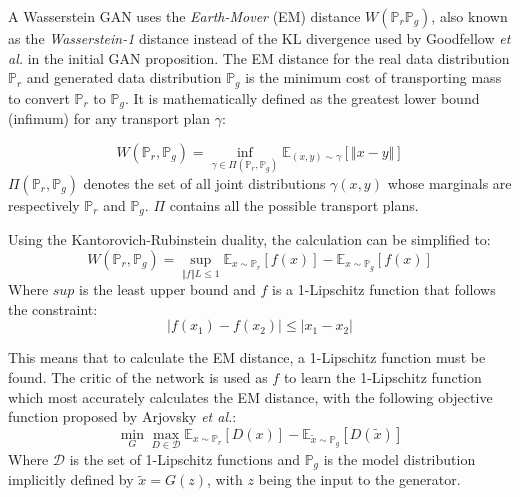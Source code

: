 \documentclass[twocolumn]{article}
\begin{document}
A Wasserstein GAN uses the \emph{Earth-Mover} (EM) distance \(W(\mathbb{P}_r \mathbb{P}_g)\), also known as the \emph{Wasserstein-1} distance instead of the KL divergence used by Goodfellow \emph{et al.}\autocite{goodfellowGenerativeAdversarialNetworks2020} in the initial GAN proposition.
The EM distance for the real data distribution \(\mathbb{P}_r\) and generated data distribution \(\mathbb{P}_g\)  is the minimum cost of transporting mass to convert \(\mathbb{P}_r\) to \(\mathbb{P}_g\).
It is mathematically defined as the greatest lower bound (infimum) for any transport plan \(\gamma\):

\begin{equation}
W(\mathbb{P}_r,\mathbb{P}_g) = \inf_{\gamma \in \Pi(\mathbb{P}_r,\mathbb{P}_g)} \mathbb{E}_{(x,y) \sim \gamma}\left[\Vert x - y \Vert \right]
\end{equation}
\(\Pi(\mathbb{P}_r, \mathbb{P}_g)\) denotes the set of all joint distributions \(\gamma(x,y)\) whose marginals are respectively \(\mathbb{P}_r\) and \(\mathbb{P}_g\).
\(\Pi\) contains all the possible transport plans.

Using the Kantorovich-Rubinstein duality, the calculation can be simplified to:
\begin{equation}
W(\mathbb{P}_r, \mathbb{P}_{g}) = \sup_{\Vert f \Vert L \leq 1} \mathbb{E}_{x \sim \mathbb{P}_r} \left[f(x)\right] - \mathbb{E}_{x \sim \mathbb{P}_{g}} \left[f(x)\right]
\end{equation}
Where \(sup\) is the least upper bound and \(f\) is a 1-Lipschitz function that follows the constraint:
\begin{equation}
\vert f(x_1) - f(x_2) \vert \leq \vert x_1 - x_2 \vert
\end{equation}

This means that to calculate the EM distance, a 1-Lipschitz function must be found.
The critic of the network is used as \(f\) to learn the 1-Lipschitz function which most accurately calculates the EM distance, with the following objective function proposed by Arjovsky \emph{et al.}\autocite{arjovskyWassersteinGenerativeAdversarial2017}:
\begin{equation}
 \min_G \max_{D \in \mathcal{D}} \mathbb{E}_{x \sim \mathbb{P}_r} \left[D(x)\right] - \mathbb{E}_{\tilde{x} \sim \mathbb{P}_g} \left[ D(\tilde{x}) \right]
\end{equation}
Where \(\mathcal{D}\) is the set of 1-Lipschitz functions and \(\mathbb{P}_g\) is the model distribution implicitly defined by \(\tilde{x} = G(z)\), with \(z\) being the input to the generator.
\end{document}
